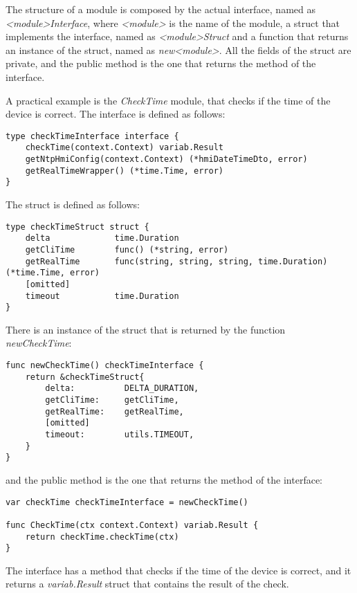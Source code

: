 The structure of a module is composed by the actual interface, named as \textit{<module>Interface}, where \textit{<module>} is the name of the module, a struct that implements the interface, named as \textit{<module>Struct} and a function that returns an instance of the struct, named as \textit{new<module>}.
All the fields of the struct are private, and the public method is the one that returns the method of the interface.

A practical example is the \textit{CheckTime} module, that checks if the time of the device is correct. The interface is defined as follows:

\begin{lstlisting}[style=golang]
type checkTimeInterface interface {
	checkTime(context.Context) variab.Result
	getNtpHmiConfig(context.Context) (*hmiDateTimeDto, error)
	getRealTimeWrapper() (*time.Time, error)
}
\end{lstlisting}

The struct is defined as follows:

\begin{lstlisting}[style=golang]
type checkTimeStruct struct {
	delta             time.Duration
	getCliTime        func() (*string, error)
	getRealTime       func(string, string, string, time.Duration) (*time.Time, error)
	[omitted]
	timeout           time.Duration
}
\end{lstlisting}

There is an instance of the struct that is returned by the function \textit{newCheckTime}:

\begin{lstlisting}[style=golang]
func newCheckTime() checkTimeInterface {
	return &checkTimeStruct{
		delta:          DELTA_DURATION,
		getCliTime:     getCliTime,
		getRealTime:    getRealTime,
		[omitted]
		timeout:        utils.TIMEOUT,
	}
}
\end{lstlisting}

and the public method is the one that returns the method of the interface:

\begin{lstlisting}[style=golang]
var checkTime checkTimeInterface = newCheckTime()

func CheckTime(ctx context.Context) variab.Result {
	return checkTime.checkTime(ctx)
}
\end{lstlisting}

The interface has a method that checks if the time of the device is correct, and it returns a \textit{variab.Result} struct that contains the result of the check.

